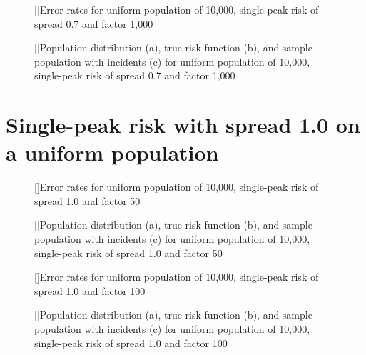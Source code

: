{\begin{figure}[!htb]
    
    []{Error rates for uniform population of 10,000, single-peak risk of \gls{spread} 0.7 and \gls{factor} 1,000}
    \label{tab:mean_error_rates:unif_1000_0.7_1h}
    
    []{Population distribution (a), true risk function (b), and sample population with incidents (c) for uniform population of 10,000, single-peak risk of \gls{spread} 0.7 and \gls{factor} 1,000}
    \label{fig:distributions:unif_1000_0.7_1h}    
\end{figure}

\section{Single-peak risk with spread 1.0 on a uniform population}
\label{sec:app:results_unif_1.0_1h}


\begin{figure}[!htb]
    
    []{Error rates for uniform population of 10,000, single-peak risk of \gls{spread} 1.0 and \gls{factor} 50}
    \label{tab:mean_error_rates:unif_50_1.0_1h}
    
    []{Population distribution (a), true risk function (b), and sample population with incidents (c) for uniform population of 10,000, single-peak risk of \gls{spread} 1.0 and \gls{factor} 50}
    \label{fig:distributions:unif_50_1.0_1h}    
\end{figure}



\begin{figure}[!htb]
    
    []{Error rates for uniform population of 10,000, single-peak risk of \gls{spread} 1.0 and \gls{factor} 100}
    \label{tab:mean_error_rates:unif_100_1.0_1h}
    
    []{Population distribution (a), true risk function (b), and sample population with incidents (c) for uniform population of 10,000, single-peak risk of \gls{spread} 1.0 and \gls{factor} 100}
    \label{fig:distributions:unif_100_1.0_1h}    
\end{figure}


}
